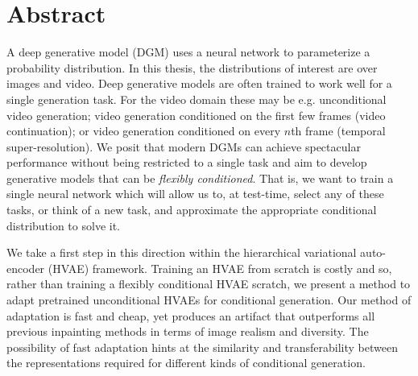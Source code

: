 
\chapter{Abstract}






A deep generative model (DGM) uses a neural network to parameterize a probability distribution. In this thesis, the distributions of interest are over images and video. Deep generative models are often trained to work well for a single generation task. For the video domain these may be e.g. unconditional video generation; video generation conditioned on the first few frames (\ie video continuation); or video generation conditioned on every $n$th frame (\ie temporal super-resolution). We posit that modern DGMs can achieve spectacular performance without being restricted to a single task and aim to develop generative models that can be \textit{flexibly conditioned}. That is, we want to train a single neural network which will allow us to, at test-time, select any of these tasks, or think of a new task, and approximate the appropriate conditional distribution to solve it.

We take a first step in this direction within the hierarchical variational auto-encoder (HVAE) framework. Training an HVAE from scratch is costly and so, rather than training a flexibly conditional HVAE scratch, we present a method to adapt pretrained unconditional HVAEs for conditional generation. Our method of adaptation is fast and cheap, yet produces an artifact that outperforms all previous inpainting methods in terms of image realism and diversity. The possibility of fast adaptation hints at the similarity and transferability between the representations required for different kinds of conditional generation.

